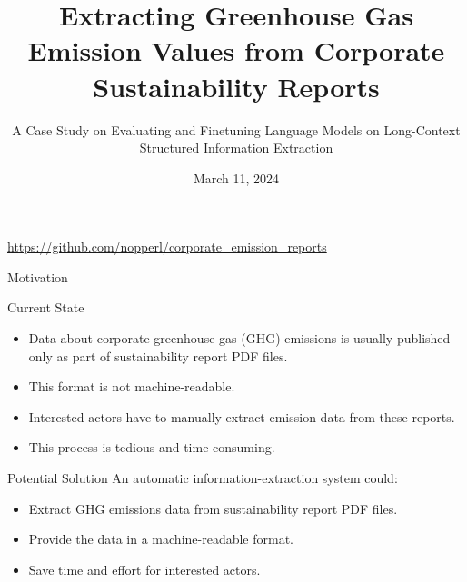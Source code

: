 \documentclass{beamer}
\title[Greenhouse Gas Emission Extraction]{Extracting Greenhouse Gas Emission Values from Corporate Sustainability Reports}
\subtitle{A Case Study on Evaluating and Finetuning Language Models on Long-Context Structured Information Extraction}
\author{}
\date{March 11, 2024}
\begin{document}
\begin{frame}[plain]
    \maketitle
    \url{https://github.com/nopperl/corporate_emission_reports}
\end{frame}
\begin{frame}{Motivation}

\begin{block}{Current State}
	\begin{itemize}
		\item Data about corporate greenhouse gas (GHG) emissions is usually published only as part of sustainability report \alert{PDF files}.
		\item This format is not \alert{machine-readable}.
		\item Interested actors have to manually extract emission data from these reports.
		\item This process is \alert{tedious} and \alert{time-consuming}.
	\end{itemize}
\end{block}

\begin{block}{Potential Solution}
	An automatic information-extraction system could:
	\begin{itemize}
		\item Extract GHG emissions data from sustainability report PDF files.
		\item Provide the data in a machine-readable format.
		\item Save time and effort for interested actors.
	\end{itemize}
\end{block}
\end{frame}

%		
\end{document}
